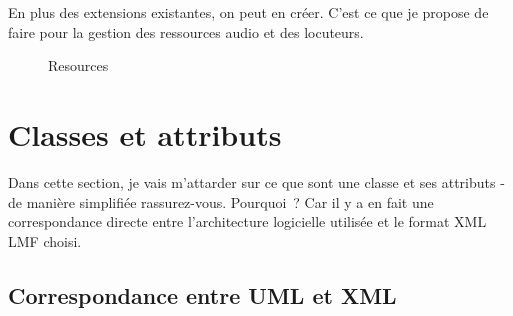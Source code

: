\documentclass[a4paper,12pt]{article}
\begin{document}
\pagebreak %

En plus des extensions existantes, on peut en cr\'eer. C'est ce que je propose de faire pour la gestion des ressources audio et des locuteurs.

\begin{figure}[h]
\centerline{}
\caption{Resources}
\end{figure}

\newpage
\section{Classes et attributs}

Dans cette section, je vais m'attarder sur ce que sont une classe et ses attributs - de mani\`ere simplifi\'ee rassurez-vous. Pourquoi~? Car il y a en fait une correspondance directe entre l'architecture logicielle utilis\'ee et le format XML LMF choisi.

\subsection{Correspondance entre UML et XML}
\end{document}
